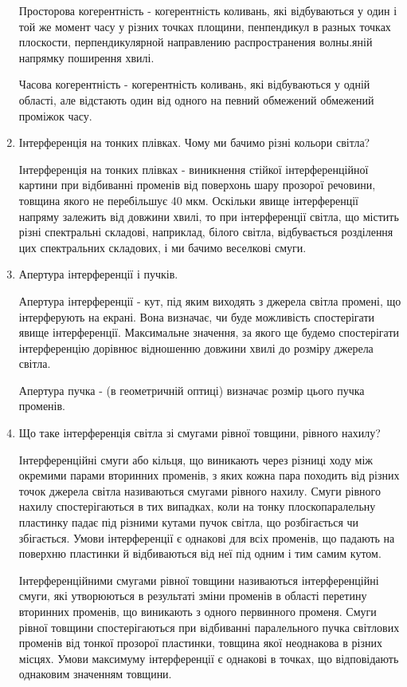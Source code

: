 \begin{enumerate}
    Просторова когерентність - когерентність коливань,
    які відбуваються у один і той же момент часу
    у різних точках площини, пенпендикул в разных точках плоскости, перпендикулярной направлению распространения волны.яній напрямку поширення хвилі.
    
    Часова когерентність - когерентність коливань, які відбуваються у одній області, але
    відстають один від одного на певний обмежений обмежений проміжок часу.
    
    \item Інтерференція на тонких плівках. Чому ми бачимо різні кольори світла?
    \bigbreak
    
    Інтерференція на тонких плівках - виникнення стійкої інтерференційної 
    картини при відбиванні променів від поверхонь шару прозорої речовини,
    товщина якого не перебільшує 40 мкм.
    Оскільки явище інтерференції напряму залежить від довжини хвилі, то
    при інтерференції світла, що містить різні спектральні складові, наприклад,
    білого світла, відбувається розділення цих спектральних складових, і ми
    бачимо веселкові смуги.

    
    \item Апертура інтерференції і пучків.
    \bigbreak

    Апертура інтерференції - кут, під яким виходять
    з джерела світла промені, що інтерферують  на екрані.
    Вона визначає, чи буде можливість спостерігати 
    явище інтерференції. Максимальне значення, за якого ще
    будемо спостерігати інтерференцію дорівнює відношенню
    довжини хвилі до розміру джерела світла. 

    Апертура пучка - (в геометричній оптиці) визначає розмір
    цього пучка променів.

    \item Що таке інтерференція світла зі смугами рівної товщини, рівного нахилу?
    \bigbreak

    Інтерференційні смуги або кільця, що виникають
    через різниці ходу між окремими парами вторинних променів, з
    яких кожна пара походить від різних точок джерела світла називаються смугами рівного нахилу.
    Смуги рівного нахилу спостерігаються в тих випадках,
    коли на тонку плоскопаралельну пластинку падає під різними
    кутами пучок світла, що розбігається чи збігається. 
    Умови інтерференції є однакові для всіх променів, що 
    падають на поверхню пластинки й відбиваються від неї під 
    одним і тим самим кутом.
 
    Інтерференційними смугами рівної товщини називаються інтерференційні смуги, які утворюються в результаті зміни променів в області
    перетину вторинних променів,
    що виникають з одного первинного променя.
    Смуги рівної товщини спостерігаються при відбиванні 
    паралельного пучка світлових променів від тонкої прозорої
    пластинки, товщина якої неоднакова в різних місцях. Умови максимуму 
    інтерференції є однакові в точках, що відповідають 
    однаковим значенням товщини.
    



\end{enumerate}